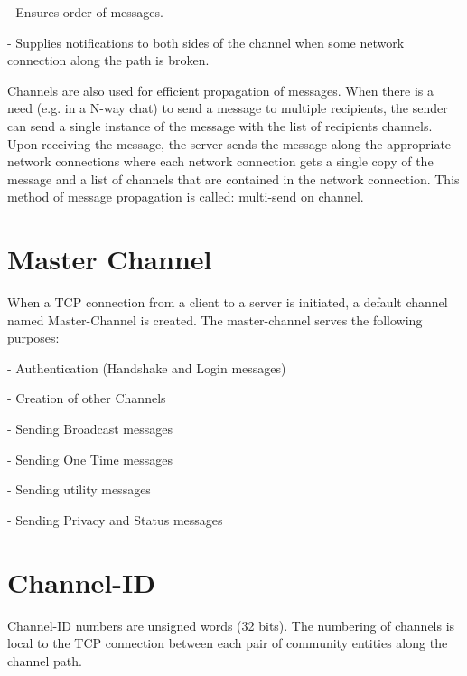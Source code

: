 \documentclass[titlepage,oneside]{book}
\begin{document}
\par{} - Ensures order of messages.

\par{} - Supplies notifications to both sides of the channel when some
network connection along the path is broken.

\par{} Channels are also used for efficient propagation of
messages. When there is a need (e.g. in a N-way chat) to send a
message to multiple recipients, the sender can send a single instance
of the message with the list of recipients channels. Upon receiving
the message, the server sends the message along the appropriate
network connections where each network connection gets a single copy
of the message and a list of channels that are contained in the
network connection. This method of message propagation is called:
multi-send on channel.

\section{Master Channel}

\par{} When a TCP connection from a client to a server is initiated, a
default channel named Master-Channel is created. The master-channel
serves the following purposes:

\par{} - Authentication (Handshake and Login messages)

\par{} - Creation of other Channels

\par{} - Sending Broadcast messages

\par{} - Sending One Time messages

\par{} - Sending utility messages

\par{} - Sending Privacy and Status messages

\section{Channel-ID}

\par{} Channel-ID numbers are unsigned words (32 bits). The numbering
of channels is local to the TCP connection between each pair of
community entities along the channel path.
\end{document}
